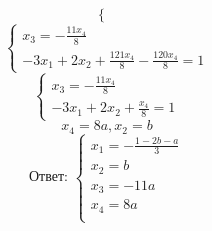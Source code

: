 \documentclass[a4paper]{article}
\renewcommand{\f}[2]{\frac{#1}{#2}}
\begin{document}
\begin{enumerate}
\begin{enumerate}
\[\begin{cases}
        \end{cases}\]
        \[\begin{cases}
            x_3=-\f{11x_4}{8}\\
            -3x_1+2x_2+\f{121x_4}{8}-\f{120x_4}{8}=1
        \end{cases}\]
        \[\begin{cases}
            x_3=-\f{11x_4}{8}\\
            -3x_1+2x_2+\f{x_4}{8}=1
        \end{cases}\]
        \[x_4=8a, x_2=b\]
        \[\textbf{Ответ: }\begin{cases}
            x_1 = -\f{1-2b-a}{3}\\
            x_2 = b\\
            x_3 = -11a\\
            x_4 = 8a\\
        \end{cases}\]


\end{enumerate}
\end{enumerate}
\end{document}
